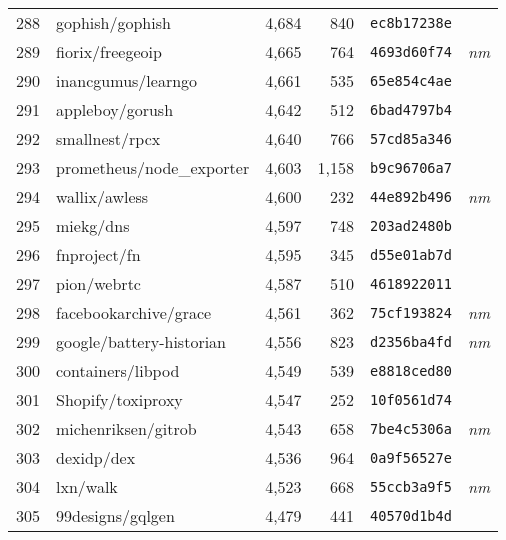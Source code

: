 {\begin{supertabular}{llrrll}
        288 &                    gophish/gophish &  4,684 &    840 &  \texttt{ec8b17238e} &              \\
        289 &                   fiorix/freegeoip &  4,665 &    764 &  \texttt{4693d60f74} &  \textit{nm} \\
        290 &                 inancgumus/learngo &  4,661 &    535 &  \texttt{65e854c4ae} &              \\
        291 &                    appleboy/gorush &  4,642 &    512 &  \texttt{6bad4797b4} &              \\
        292 &                     smallnest/rpcx &  4,640 &    766 &  \texttt{57cd85a346} &              \\
        293 &          prometheus/node\_exporter &  4,603 &  1,158 &  \texttt{b9c96706a7} &              \\
        294 &                      wallix/awless &  4,600 &    232 &  \texttt{44e892b496} &  \textit{nm} \\
        295 &                          miekg/dns &  4,597 &    748 &  \texttt{203ad2480b} &              \\
        296 &                       fnproject/fn &  4,595 &    345 &  \texttt{d55e01ab7d} &              \\
        297 &                        pion/webrtc &  4,587 &    510 &  \texttt{4618922011} &              \\
        298 &              facebookarchive/grace &  4,561 &    362 &  \texttt{75cf193824} &  \textit{nm} \\
        299 &           google/battery-historian &  4,556 &    823 &  \texttt{d2356ba4fd} &  \textit{nm} \\
        300 &                  containers/libpod &  4,549 &    539 &  \texttt{e8818ced80} &              \\
        301 &                  Shopify/toxiproxy &  4,547 &    252 &  \texttt{10f0561d74} &              \\
        302 &                michenriksen/gitrob &  4,543 &    658 &  \texttt{7be4c5306a} &  \textit{nm} \\
        303 &                         dexidp/dex &  4,536 &    964 &  \texttt{0a9f56527e} &              \\
        304 &                           lxn/walk &  4,523 &    668 &  \texttt{55ccb3a9f5} &  \textit{nm} \\
        305 &                   99designs/gqlgen &  4,479 &    441 &  \texttt{40570d1b4d} &              \\

\end{supertabular}}
